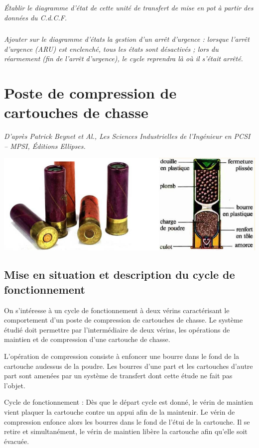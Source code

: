 \documentclass[10pt]{article}
\begin{document}
\subparagraph{}
\textit{Établir le diagramme d’état de cette unité de transfert de mise en pot à partir des
données du C.d.C.F.}

\subparagraph{}
\textit{Ajouter sur le diagramme d’états la gestion d’un arrêt d’urgence : lorsque l’arrêt d’urgence
(ARU) est enclenché, tous les états sont désactivés ; lors du réarmement (fin de l’arrêt
d’urgence), le cycle reprendra là où il s’était arrêté.}

\newpage 

\section*{Poste de compression de cartouches de chasse}
\begin{flushright}
\textit{D'après Patrick Beynet et Al., Les Sciences Industrielles de l'Ingénieur en PCSI -- MPSI, Éditions Ellipses.}
\end{flushright}
\begin{center}
\includegraphics[width=.5\textwidth]{images/fig_10}
\end{center}
\setcounter{subparagraph}{0}

\subsection*{Mise en situation et description du cycle de fonctionnement}

On s’intéresse à un cycle de fonctionnement à deux vérins caractérisant le comportement d’un
poste de compression de cartouches de chasse. Le système étudié doit permettre par
l’intermédiaire de deux vérins, les opérations de maintien et de compression d’une cartouche de
chasse.

L’opération de compression consiste à enfoncer une bourre dans le fond de la cartouche audessus
de la poudre. Les bourres d’une part et les cartouches d’autre part sont amenées par un
système de transfert dont cette étude ne fait pas l’objet.

Cycle de fonctionnement :
Dès que le départ cycle est donné, le vérin de maintien vient plaquer la cartouche contre un
appui afin de la maintenir. Le vérin de compression enfonce alors les bourres dans le fond de
l’étui de la cartouche. Il se retire et simultanément, le vérin de maintien libère la cartouche afin
qu’elle soit évacuée.
\end{document}
